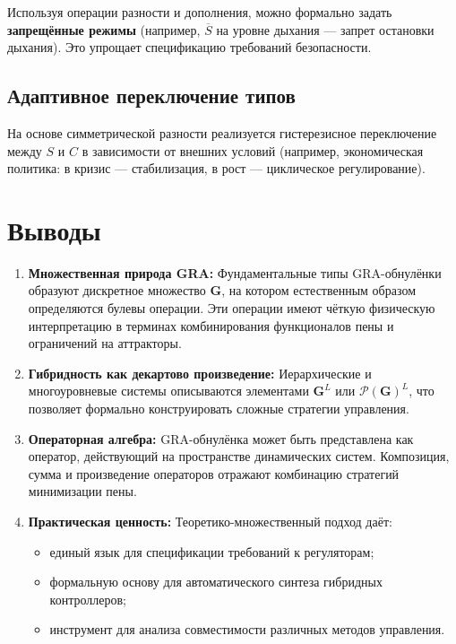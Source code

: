 \documentclass[12pt,a4paper]{article}
\newcommand{\G}{\mathbf{G}}
\newcommand{\Pset}{\mathcal{P}}
\begin{document}
Используя операции разности и дополнения, можно формально задать \textbf{запрещённые режимы} (например, $\overline{S}$ на уровне дыхания — запрет остановки дыхания). Это упрощает спецификацию требований безопасности.

\subsection{Адаптивное переключение типов}

На основе симметрической разности реализуется гистерезисное переключение между $S$ и $C$ в зависимости от внешних условий (например, экономическая политика: в кризис — стабилизация, в рост — циклическое регулирование).

\section{Выводы}
\label{sec:conclusions}

\begin{enumerate}
    \item \textbf{Множественная природа GRA:} Фундаментальные типы GRA-обнулёнки образуют дискретное множество $\G$, на котором естественным образом определяются булевы операции. Эти операции имеют чёткую физическую интерпретацию в терминах комбинирования функционалов пены и ограничений на аттракторы.
    \item \textbf{Гибридность как декартово произведение:} Иерархические и многоуровневые системы описываются элементами $\G^L$ или $\Pset(\G)^L$, что позволяет формально конструировать сложные стратегии управления.
    \item \textbf{Операторная алгебра:} GRA-обнулёнка может быть представлена как оператор, действующий на пространстве динамических систем. Композиция, сумма и произведение операторов отражают комбинацию стратегий минимизации пены.
    \item \textbf{Практическая ценность:} Теоретико-множественный подход даёт:
    \begin{itemize}
        \item единый язык для спецификации требований к регуляторам;
        \item формальную основу для автоматического синтеза гибридных контроллеров;
        \item инструмент для анализа совместимости различных методов управления.
    \end{itemize}
\end{enumerate}
\end{document}
